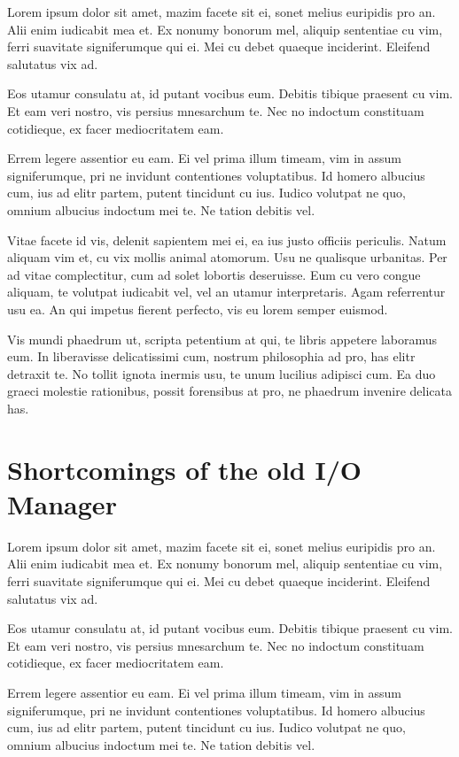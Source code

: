 \documentclass[a4paper,11pt,oneside]{report}
\begin{document}
Lorem ipsum dolor sit amet, mazim facete sit ei, sonet melius euripidis pro
an. Alii enim iudicabit mea et. Ex nonumy bonorum mel, aliquip sententiae cu
vim, ferri suavitate signiferumque qui ei. Mei cu debet quaeque
inciderint. Eleifend salutatus vix ad.

Eos utamur consulatu at, id putant vocibus eum. Debitis tibique praesent cu
vim. Et eam veri nostro, vis persius mnesarchum te. Nec no indoctum constituam
cotidieque, ex facer mediocritatem eam.

Errem legere assentior eu eam. Ei vel prima illum timeam, vim in assum
signiferumque, pri ne invidunt contentiones voluptatibus. Id homero albucius
cum, ius ad elitr partem, putent tincidunt cu ius. Iudico volutpat ne quo,
omnium albucius indoctum mei te. Ne tation debitis vel.

Vitae facete id vis, delenit sapientem mei ei, ea ius justo officiis
periculis. Natum aliquam vim et, cu vix mollis animal atomorum. Usu ne qualisque
urbanitas. Per ad vitae complectitur, cum ad solet lobortis deseruisse. Eum cu
vero congue aliquam, te volutpat iudicabit vel, vel an utamur
interpretaris. Agam referrentur usu ea. An qui impetus fierent perfecto, vis eu
lorem semper euismod.

Vis mundi phaedrum ut, scripta petentium at qui, te libris appetere laboramus
eum. In liberavisse delicatissimi cum, nostrum philosophia ad pro, has elitr
detraxit te. No tollit ignota inermis usu, te unum lucilius adipisci cum. Ea duo
graeci molestie rationibus, possit forensibus at pro, ne phaedrum invenire
delicata has.

\section{Shortcomings of the old I/O Manager}

Lorem ipsum dolor sit amet, mazim facete sit ei, sonet melius euripidis pro
an. Alii enim iudicabit mea et. Ex nonumy bonorum mel, aliquip sententiae cu
vim, ferri suavitate signiferumque qui ei. Mei cu debet quaeque
inciderint. Eleifend salutatus vix ad.

Eos utamur consulatu at, id putant vocibus eum. Debitis tibique praesent cu
vim. Et eam veri nostro, vis persius mnesarchum te. Nec no indoctum constituam
cotidieque, ex facer mediocritatem eam.

Errem legere assentior eu eam. Ei vel prima illum timeam, vim in assum
signiferumque, pri ne invidunt contentiones voluptatibus. Id homero albucius
cum, ius ad elitr partem, putent tincidunt cu ius. Iudico volutpat ne quo,
omnium albucius indoctum mei te. Ne tation debitis vel.
\end{document}
